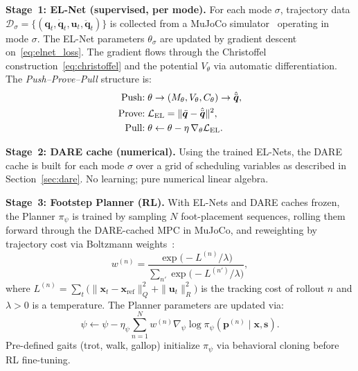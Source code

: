 \documentclass[letterpaper, 10pt, conference]{IEEEtran}
\newcommand{\bx}{\bm{x}}
\newcommand{\bu}{\bm{u}}
\newcommand{\bq}{\bm{q}}
\newcommand{\bp}{\bm{p}}
\begin{document}
\textbf{Stage~1: EL-Net (supervised, per mode).}
For each mode $\sigma$, trajectory data
$\mathcal{D}_\sigma = \{(\bq_t, \dot{\bq}_t,
\bu_t, \ddot{\bq}_t)\}$ is collected from a MuJoCo
simulator~\cite{todorov2012} operating in mode $\sigma$.
The EL-Net parameters $\theta_\sigma$ are updated by
gradient descent on~\eqref{eq:elnet_loss}.
The gradient flows through the Christoffel
construction~\eqref{eq:christoffel} and the potential
$V_\theta$ via automatic differentiation.
The \emph{Push--Prove--Pull} structure is:
\begin{align}
  \text{Push:}\; &\theta \to (M_\theta, V_\theta, C_\theta)
    \to \hat{\ddot{\bq}}, \notag\\
  \text{Prove:}\; &\mathcal{L}_{\mathrm{EL}}
    = \|\ddot{\bq} - \hat{\ddot{\bq}}\|^2,
    \label{eq:ppp_elnet}\\
  \text{Pull:}\; &\theta \gets \theta
    - \eta \, \nabla_\theta \mathcal{L}_{\mathrm{EL}}.
    \notag
\end{align}

\textbf{Stage~2: DARE cache (numerical).}
Using the trained EL-Nets, the DARE cache is built
for each mode $\sigma$ over a grid of scheduling variables
as described in Section~\ref{sec:dare}.
No learning; pure numerical linear algebra.

\textbf{Stage~3: Footstep Planner (RL).}
With EL-Nets and DARE caches frozen, the Planner $\pi_\psi$
is trained by sampling $N$ foot-placement sequences,
rolling them forward through the DARE-cached MPC in MuJoCo,
and reweighting by trajectory cost via Boltzmann
weights~\cite{williams2017}:
\begin{equation}\label{eq:boltzmann}
  w^{(n)} = \frac{\exp\bigl(-L^{(n)} / \lambda\bigr)}
    {\sum_{n'} \exp\bigl(-L^{(n')} / \lambda\bigr)},
\end{equation}
where $L^{(n)} = \sum_{t}
\bigl(\|\bx_t - \bx_{\mathrm{ref}}\|_Q^2
      + \|\bu_t\|_R^2\bigr)$
is the tracking cost of rollout $n$
and $\lambda > 0$ is a temperature.
The Planner parameters are updated via:
\begin{equation}\label{eq:planner_grad}
  \psi \gets \psi - \eta_\psi \sum_{n=1}^N
    w^{(n)} \nabla_\psi \log
    \pi_\psi(\bp^{(n)} \mid \bx, \bm{s}).
\end{equation}
Pre-defined gaits (trot, walk, gallop) initialize
$\pi_\psi$ via behavioral cloning before RL fine-tuning.
\end{document}
